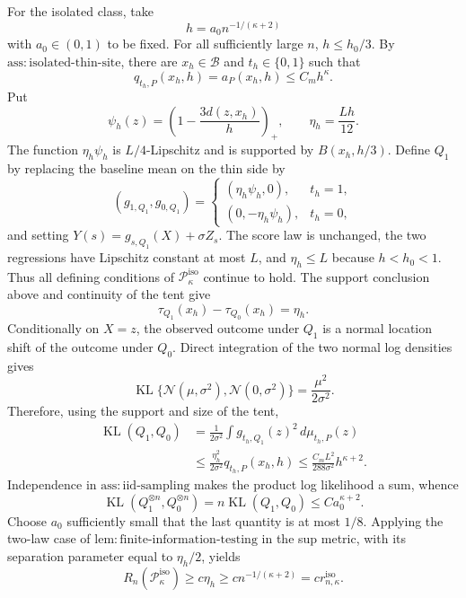 For the isolated class, take
\[
 h=a_0 n^{-1/(\kappa+2)}
\]
with \(a_0\in(0,1)\) to be fixed.  For all sufficiently large \(n\), \(h\le h_0/3\).  By \(\mathrm{ass:isolated\text{-}thin\text{-}site}\), there are \(x_h\in\mathcal B\) and \(t_h\in\{0,1\}\) such that
\[
 q_{t_h,P}(x_h,h)=a_P(x_h,h)\le C_mh^\kappa.
\]
Put
\[
 \psi_h(z)=\left(1-\frac{3d(z,x_h)}h\right)_+,
 \qquad \eta_h=\frac{Lh}{12}.
\]
The function \(\eta_h\psi_h\) is \(L/4\)-Lipschitz and is supported by \(B(x_h,h/3)\).  Define \(Q_1\) by replacing the baseline mean on the thin side by
\[
 (g_{1,Q_1},g_{0,Q_1})=
 \begin{cases}
 (\eta_h\psi_h,0),&t_h=1,\\
 (0,-\eta_h\psi_h),&t_h=0,
 \end{cases}
\]
and setting \(Y(s)=g_{s,Q_1}(X)+\sigma Z_s\).  The score law is unchanged, the two regressions have Lipschitz constant at most \(L\), and \(\eta_h\le L\) because \(h<h_0<1\).  Thus all defining conditions of \(\mathcal P_\kappa^{\mathrm{iso}}\) continue to hold.  The support conclusion above and continuity of the tent give
\[
 \tau_{Q_1}(x_h)-\tau_{Q_0}(x_h)=\eta_h.
\]
Conditionally on \(X=z\), the observed outcome under \(Q_1\) is a normal location shift of the outcome under \(Q_0\).  Direct integration of the two normal log densities gives
\[
 \operatorname{KL}\{\mathcal N(\mu,\sigma^2),\mathcal N(0,\sigma^2)\}
 =\frac{\mu^2}{2\sigma^2}.
\]
Therefore, using the support and size of the tent,
\[
 \begin{aligned}
 \operatorname{KL}(Q_1,Q_0)
 &=\frac1{2\sigma^2}\int g_{t_h,Q_1}(z)^2\,d\mu_{t_h,P}(z)\\
 &\le\frac{\eta_h^2}{2\sigma^2}q_{t_h,P}(x_h,h)
 \le \frac{C_mL^2}{288\sigma^2}h^{\kappa+2}.
 \end{aligned}
\]
Independence in \(\mathrm{ass:iid\text{-}sampling}\) makes the product log likelihood a sum, whence
\[
 \operatorname{KL}(Q_1^{\otimes n},Q_0^{\otimes n})
 =n\operatorname{KL}(Q_1,Q_0)
 \le C a_0^{\kappa+2}.
\]
Choose \(a_0\) sufficiently small that the last quantity is at most \(1/8\).  Applying the two-law case of \(\mathrm{lem:finite\text{-}information\text{-}testing}\) in the sup metric, with its separation parameter equal to \(\eta_h/2\), yields
\[
 R_n(\mathcal P_\kappa^{\mathrm{iso}})
 \ge c\eta_h
 \ge c n^{-1/(\kappa+2)}
 =c r_{n,\kappa}^{\mathrm{iso}}.
\]

